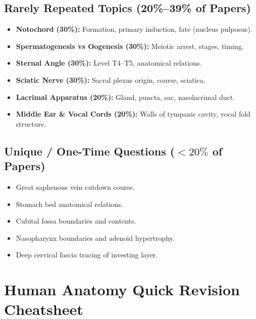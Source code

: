 \documentclass[11pt,a4paper]{article}
\begin{document}
\subsection{Rarely Repeated Topics (20\%--39\% of Papers)}
\begin{itemize}[leftmargin=*]
    \item \textbf{Notochord (30\%):} Formation, primary induction, fate (nucleus pulposus).
    \item \textbf{Spermatogenesis vs Oogenesis (30\%):} Meiotic arrest, stages, timing.
    \item \textbf{Sternal Angle (30\%):} Level T4--T5, anatomical relations.
    \item \textbf{Sciatic Nerve (30\%):} Sacral plexus origin, course, sciatica.
    \item \textbf{Lacrimal Apparatus (20\%):} Gland, puncta, sac, nasolacrimal duct.
    \item \textbf{Middle Ear & Vocal Cords (20\%):} Walls of tympanic cavity, vocal fold structure.
\end{itemize}

\subsection{Unique / One-Time Questions ($<20\%$ of Papers)}
\begin{itemize}[leftmargin=*]
    \item Great saphenous vein cutdown course.
    \item Stomach bed anatomical relations.
    \item Cubital fossa boundaries and contents.
    \item Nasopharynx boundaries and adenoid hypertrophy.
    \item Deep cervical fascia tracing of investing layer.
\end{itemize}

\newpage
\appendix
\section{Human Anatomy Quick Revision Cheatsheet}
\end{document}
